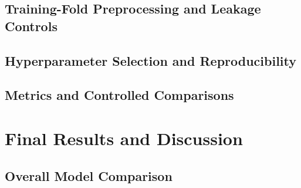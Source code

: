 \documentclass[conference]{IEEEtran}
\newif\ifoutline
\newcommand{\guide}[1]{%
  \ifoutline\par\noindent{\small\color{blue!65!black}%
  \textit{Writing prompt: #1}}\par\fi}
\begin{document}
\subsection{Training-Fold Preprocessing and Leakage Controls}
\guide{Describe how numerical imputation, scaling, categorical vocabularies
and infrequent-category grouping were fitted inside each historical training
fold. Explain any model-specific exceptions. Exclude target-derived inputs.
State how unknown categories and auxiliary missingness were handled.}

\subsection{Hyperparameter Selection and Reproducibility}
\guide{Report the actual search strategy, search space, validation criterion,
random seeds, software versions and relevant resource constraints. The
existing Ridge search uses alpha in \{0.1, 1, 10, 100\}; update this if expanded.
Summarise decisive settings in the main text and put the full grid in the
appendix. Every result must be traceable to a saved experiment configuration.}

\subsection{Metrics and Controlled Comparisons}
\guide{Use RMSE as the primary metric and MAE and R-squared as supporting
diagnostics. Define whether results are unweighted means of fold metrics or
pooled validation metrics. Use identical record IDs and original labels for
feature comparisons. State the tuning protocol for model comparisons.
If uncertainty is reported, specify how temporal dependence was handled.}

\section{Final Results and Discussion}
\label{sec:results}

\subsection{Overall Model Comparison}
\guide{Fill Table~\ref{tab:mainresults} with the final verified results from
one consistent evaluation protocol. Compare the reference, baseline,
improved model and selected final configuration. Explain why the final model
was selected, including performance consistency and relevant trade-offs.
All values below remain TBD until the final runs are frozen.}
\end{document}
